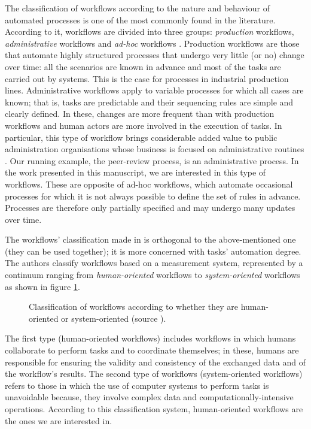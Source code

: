 The classification of workflows according to the nature and behaviour of automated processes is one of the most commonly found in the literature. According to it, workflows are divided into three groups: \textit{production} workflows, \textit{administrative} workflows and \textit{ad-hoc} workflows \cite{mcCready, van1998application}. Production workflows are those that automate highly structured processes that undergo very little (or no) change over time: all the scenarios are known in advance and most of the tasks are carried out by systems. This is the case for processes in industrial production lines. 
Administrative workflows apply to variable processes for which all cases are known; that is, tasks are predictable and their sequencing rules are simple and clearly defined. In these, changes are more frequent than with production workflows and human actors are more involved in the execution of tasks. In particular, this type of workflow brings considerable added value to public administration organisations whose business is focused on administrative routines \cite{boukhedouma2015adaptation}. Our running example, the peer-review process, is an administrative process. In the work presented in this manuscript, we are interested in this type of workflows.
These are opposite of ad-hoc workflows, which automate occasional processes for which it is not always possible to define the set of rules in advance. Processes are therefore only partially specified and may undergo many updates over time.

The workflows' classification made in \cite{workflow95} is orthogonal to the above-mentioned one (they can be used together); it is more concerned with tasks' automation degree. The authors classify workflows based on a measurement system, represented by a continuum ranging from \textit{human-oriented} workflows to \textit{system-oriented} workflows as shown in figure \ref{chap1:fig:dimitrios-classification}.
\begin{figure}[ht!]
	\noindent
	\caption{Classification of workflows according to whether they are human-oriented or system-oriented (source \cite{workflow95}).}
	\label{chap1:fig:dimitrios-classification}
\end{figure}
The first type (human-oriented workflows) includes workflows in which humans collaborate to perform tasks and to coordinate themselves; in these, humans are responsible for ensuring the validity and consistency of the exchanged data and of the workflow's results. The second type of workflows (system-oriented workflows) refers to those in which the use of computer systems to perform tasks is unavoidable because, they involve complex data and computationally-intensive operations. According to this classification system, human-oriented workflows are the ones we are interested in.

